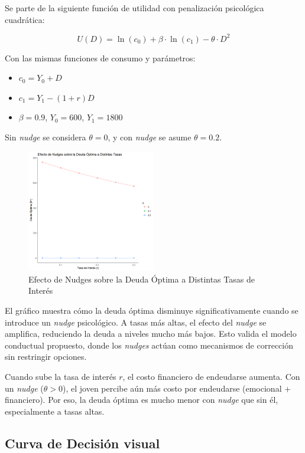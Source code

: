 \documentclass[10pt]{article}
\begin{document}
\begin{multicols}{2}
Se parte de la siguiente función de utilidad con penalización psicológica cuadrática:

\[
U(D) = \ln(c_0) + \beta \cdot \ln(c_1) - \theta \cdot D^2
\]

Con las mismas funciones de consumo y parámetros:

\begin{itemize}
    \item $c_0 = Y_0 + D$
    \item $c_1 = Y_1 - (1 + r)D$
    \item $\beta = 0.9$, $Y_0 = 600$, $Y_1 = 1800$
\end{itemize}

Sin \textit{nudge} se considera $\theta = 0$, y con \textit{nudge} se asume $\theta = 0.2$.

\begin{figure}[H]
    \centering
    \includegraphics[width=0.5\textwidth]{Inudges_tasa_interes.png}
    \caption{Efecto de Nudges sobre la Deuda Óptima a Distintas Tasas de Interés}
    \label{fig:fig-nudges-tasa}
\end{figure}

 El gráfico muestra cómo la deuda óptima disminuye significativamente cuando se introduce un \textit{nudge} psicológico. A tasas más altas, el efecto del \textit{nudge} se amplifica, reduciendo la deuda a niveles mucho más bajos. Esto valida el modelo conductual propuesto, donde los \textit{nudges} actúan como mecanismos de corrección sin restringir opciones.

\noindent Cuando sube la tasa de interés $r$, el costo financiero de endeudarse aumenta. Con un \textit{nudge} ($\theta > 0$), el joven percibe aún más costo por endeudarse (emocional + financiero). Por eso, la deuda óptima es mucho menor con \textit{nudge} que sin él, especialmente a tasas altas.


\subsection{Curva de Decisión visual}


\end{multicols}
\end{document}
